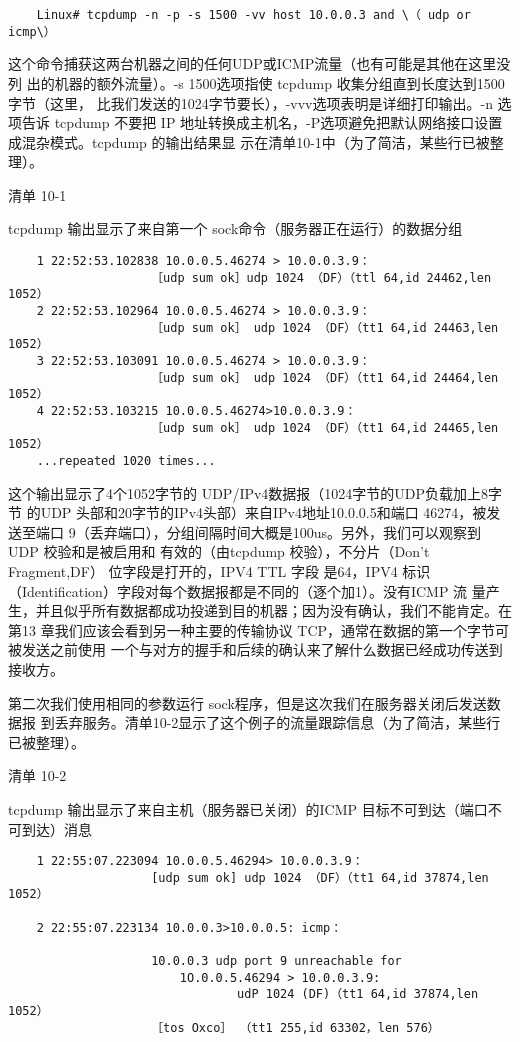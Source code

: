 \begin{verbatim}
    Linux# tcpdump -n -p -s 1500 -vv host 10.0.0.3 and \（ udp or icmp\）
\end{verbatim}

这个命令捕获这两台机器之间的任何UDP或ICMP流量（也有可能是其他在这里没列
出的机器的额外流量）。-s 1500选项指使 tcpdump 收集分组直到长度达到1500字节（这里，
比我们发送的1024字节要长），-vvv选项表明是详细打印输出。-n 选项告诉 tcpdump 不要把
IP 地址转换成主机名，-P选项避免把默认网络接口设置成混杂模式。tcpdump 的输出结果显
示在清单10-1中（为了简洁，某些行已被整理）。

清单 10-1

tcpdump 输出显示了来自第一个 sock命令（服务器正在运行）的数据分组
\begin{verbatim}
    1 22:52:53.102838 10.0.0.5.46274 > 10.0.0.3.9：
                    ［udp sum ok］udp 1024 （DF）（ttl 64,id 24462,len 1052）
    2 22:52:53.102964 10.0.0.5.46274 > 10.0.0.3.9：
                    ［udp sum ok］ udp 1024 （DF）（tt1 64,id 24463,len 1052）
    3 22:52:53.103091 10.0.0.5.46274 > 10.0.0.3.9：
                    ［udp sum ok］ udp 1024 （DF）（tt1 64,id 24464,len 1052）
    4 22:52:53.103215 10.0.0.5.46274>10.0.0.3.9：
                    ［udp sum ok］ udp 1024 （DF）（tt1 64,id 24465,len 1052）
    ...repeated 1020 times...
\end{verbatim}

这个输出显示了4个1052字节的 UDP/IPv4数据报（1024字节的UDP负载加上8字节
的UDP 头部和20字节的IPv4头部）来自IPv4地址10.0.0.5和端口 46274，被发送至端口
9（丢弃端口），分组间隔时间大概是100us。另外，我们可以观察到 UDP 校验和是被启用和
有效的（由tcpdump 校验），不分片（Don't Fragment,DF） 位字段是打开的，IPV4 TTL 字段
是64，IPV4 标识（Identification）字段对每个数据报都是不同的（逐个加1）。没有ICMP 流
量产生，并且似乎所有数据都成功投递到目的机器；因为没有确认，我们不能肯定。在第13
章我们应该会看到另一种主要的传输协议 TCP，通常在数据的第一个字节可被发送之前使用
一个与对方的握手和后续的确认来了解什么数据已经成功传送到接收方。

第二次我们使用相同的参数运行 sock程序，但是这次我们在服务器关闭后发送数据报
到丢弃服务。清单10-2显示了这个例子的流量跟踪信息（为了简洁，某些行已被整理）。

清单 10-2

tcpdump 输出显示了来自主机（服务器已关闭）的ICMP 目标不可到达（端口不可到达）消息

\begin{verbatim}
    1 22:55:07.223094 10.0.0.5.46294> 10.0.0.3.9：
                    [udp sum ok] udp 1024 （DF）（tt1 64,id 37874,len 1052）

    2 22:55:07.223134 10.0.0.3>10.0.0.5: icmp：

                    10.0.0.3 udp port 9 unreachable for
                        1O.0.0.5.46294 > 10.0.0.3.9:
                                udP 1024 (DF)（tt1 64,id 37874,len 1052）
                    ［tos Oxco］ （tt1 255,id 63302，len 576）
\end{verbatim}

